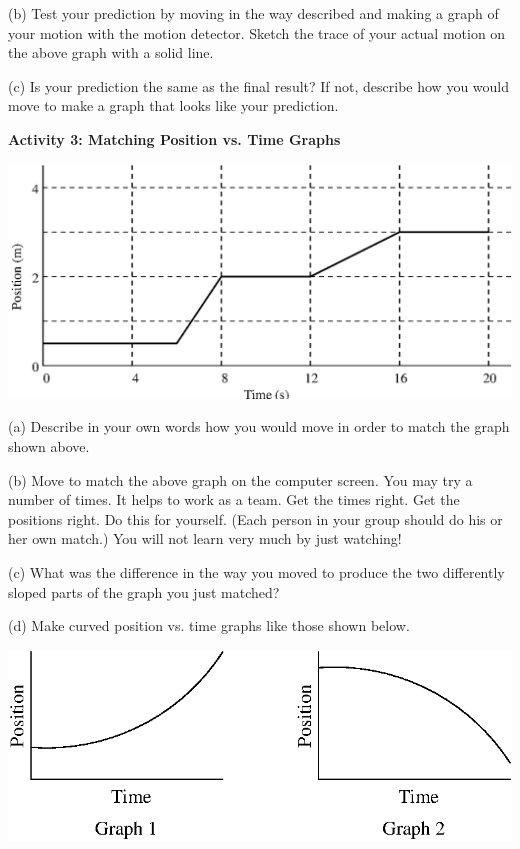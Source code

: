 (b) Test your prediction by moving in the way described and making a graph of
your motion with the motion detector. Sketch the trace of your actual motion
on the above graph with a solid line. 

(c) Is your prediction the same as the final result? If not, describe how you
would move to make a graph that looks like your prediction.
\vspace{20mm}

\textbf{Activity 3: Matching Position vs. Time Graphs}

\vspace{0.3cm}
{\par\centering \includegraphics{position_fig3.eps} \par}
\vspace{0.3cm}

(a) Describe in your own words how you would move in order to match the graph
shown above.
\vspace{30mm}

(b) Move to match the above graph on the computer screen. You may try a number
of times. It helps to work as a team. Get the times right. Get the positions
right. Do this for yourself. (Each person in your group should do his or her
own match.) You will not learn very much by just watching!

(c) What was the difference in the way you moved to produce the two differently
sloped parts of the graph you just matched?
\vspace{20mm}

(d) Make curved position vs. time graphs like those shown below.

\vspace{0.3cm}
{\par\centering \includegraphics{position_fig4.eps} \par}
\vspace{0.3cm}

